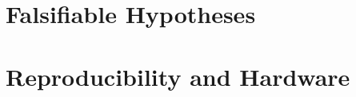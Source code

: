 
\section{Falsifiable Hypotheses}
\label{sec:method-hypotheses}


\section{Reproducibility and Hardware}
\label{sec:method-repro}


